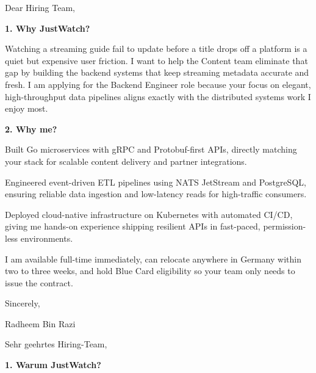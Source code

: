 \documentclass[11pt,a4paper]{coverletter}
\begin{document}

\opening{Dear Hiring Team,}

\vspace{8pt}\noindent\textbf{1. Why JustWatch?}\par\vspace{3pt}

Watching a streaming guide fail to update before a title drops off a platform is a quiet but expensive user friction. I want to help the Content team eliminate that gap by building the backend systems that keep streaming metadata accurate and fresh. I am applying for the Backend Engineer role because your focus on elegant, high-throughput data pipelines aligns exactly with the distributed systems work I enjoy most.

\vspace{8pt}\noindent\textbf{2. Why me?}\par\vspace{3pt}

\bullets

  \item Built Go microservices with gRPC and Protobuf-first APIs, directly matching your stack for scalable content delivery and partner integrations.

  \item Engineered event-driven ETL pipelines using NATS JetStream and PostgreSQL, ensuring reliable data ingestion and low-latency reads for high-traffic consumers.

  \item Deployed cloud-native infrastructure on Kubernetes with automated CI/CD, giving me hands-on experience shipping resilient APIs in fast-paced, permission-less environments.

\bulletsend

I am available full-time immediately, can relocate anywhere in Germany within two to three weeks, and hold Blue Card eligibility so your team only needs to issue the contract.

\closing{Sincerely,}{Radheem Bin Razi}

\clearpage
{}


\opening{Sehr geehrtes Hiring-Team,}

\vspace{8pt}\noindent\textbf{1. Warum JustWatch?}\par\vspace{3pt}
\end{document}
